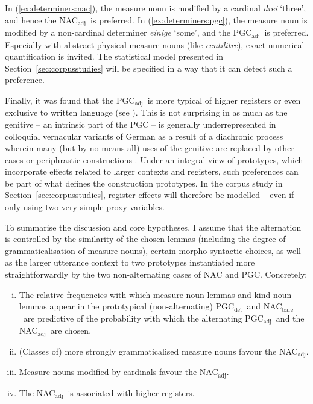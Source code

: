 \documentclass[USenglish]{article}
\newcommand{\Sub}[1]{\ensuremath{\mathrm{_{#1}}}}
\newcommand{\NACb}{NAC\Sub{bare}}
\newcommand{\NACa}{NAC\Sub{adj}}
\newcommand{\PGCd}{PGC\Sub{det}}
\newcommand{\PGCa}{PGC\Sub{adj}}
\begin{document}
In (\ref{ex:determiners:nac}), the measure noun is modified by a cardinal \textit{drei} `three', and hence the \NACa\ is preferred.
In (\ref{ex:determiners:pgc}), the measure noun is modified by a non-cardinal determiner \textit{einige} `some', and the \PGCa\ is preferred.
Especially with abstract physical measure nouns (like \textit{centilitre}), exact numerical quantification is invited.
The statistical model presented in Section~\ref{sec:corpusstudies} will be specified in a way that it can detect such a preference.

Finally, it was found that the \PGCa\ is more typical of higher registers or even exclusive to written language (see \citealp[320--323]{Hentschel1993}).
This is not surprising in as much as the genitive -- an intrinsic part of the PGC -- is generally underrepresented in colloquial vernacular variants of German as a result of a diachronic process wherein many (but by no means all) uses of the genitive are replaced by other cases or periphrastic constructions \citep{FleischerSchallert2011}.
Under an integral view of prototypes, which incorporate effects related to larger contexts and registers, such preferences can be part of what defines the construction prototypes.
In the corpus study in Section~\ref{sec:corpusstudies}, register effects will therefore be modelled -- even if only using two very simple proxy variables.

To summarise the discussion and core hypotheses, I assume that the alternation is controlled by the similarity of the chosen lemmas (including the degree of grammaticalisation of measure nouns), certain morpho-syntactic choices, as well as the larger utterance context to two prototypes instantiated more straightforwardly by the two non-alternating cases of NAC and PGC.
Concretely:

\begin{enumerate}[i.]
  \item The relative frequencies with which measure noun lemmas and kind noun lemmas appear in the prototypical (non-alternating) \PGCd\ and \NACb\ are predictive of the probability with which the alternating \PGCa\ and the \NACa\ are chosen.
  \item (Classes of) more strongly grammaticalised measure nouns favour the \NACa.
  \item Measure nouns modified by cardinals favour the \NACa.
  \item The \NACa\ is associated with higher registers.
\end{enumerate}
\end{document}
